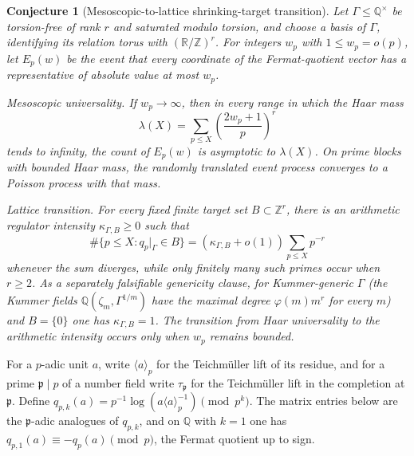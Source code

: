 \documentclass[11pt]{article}
\newtheorem{conjecture}{Conjecture}
\theoremstyle{definition}
\newcommand{\Z}{\mathbb Z}
\newcommand{\Q}{\mathbb Q}
\newcommand{\R}{\mathbb R}
\providecommand{\Z}{\mathbb Z}
\providecommand{\Q}{\mathbb Q}
\providecommand{\R}{\mathbb R}
\begin{document}
\begin{conjecture}[Mesoscopic-to-lattice shrinking-target transition]\label{s13}
Let $\Gamma\le\Q^\times$ be torsion-free of rank $r$ and saturated modulo torsion, and choose a
basis of $\Gamma$, identifying its relation torus with $(\R/\Z)^r$.  For integers $w_p$ with $1\le w_p=o(p)$, let $E_p(w)$ be the event
that every coordinate of the Fermat-quotient vector has a representative of absolute
value at most $w_p$.

\emph{Mesoscopic universality.}  If $w_p\to\infty$, then in every range in which the
Haar mass
\[
 \lambda(X)=\sum_{p\le X}\left(\frac{2w_p+1}{p}\right)^r
\]
tends to infinity, the count of $E_p(w)$ is asymptotic to $\lambda(X)$.  On prime
blocks with bounded Haar mass, the randomly translated event process converges to
a Poisson process with that mass.

\emph{Lattice transition.}  For every fixed finite target set
$B\subset\Z^r$, there is an arithmetic regulator intensity
$\kappa_{\Gamma,B}\ge0$ such that
\[
 \#\{p\le X:q_p|_\Gamma\in B\}
 =(\kappa_{\Gamma,B}+o(1))\sum_{p\le X}p^{-r}
\]
whenever the sum diverges, while only finitely many such primes occur when $r\ge2$.
As a separately falsifiable genericity clause, for Kummer-generic $\Gamma$ (the Kummer fields $\Q(\zeta_m,\Gamma^{1/m})$ have the maximal degree $\varphi(m)m^{r}$ for every $m$) and $B=\{0\}$ one has $\kappa_{\Gamma,B}=1$.  The transition from
Haar universality to the arithmetic intensity occurs only when $w_p$ remains bounded.
\end{conjecture}

For a $p$-adic unit $a$, write $\langle a\rangle_p$ for the Teichm\"uller lift of
its residue, and for a prime $\mathfrak p\mid p$ of a number field write
$\tau_{\mathfrak p}$ for the Teichm\"uller lift in the completion at
$\mathfrak p$.  Define
$ q_{p,k}(a)=p^{-1}\log(a\langle a\rangle_p^{-1})\pmod{p^k}$.  The matrix entries below are the $\mathfrak p$-adic analogues of $q_{p,k}$, and on $\Q$ with $k=1$ one has $q_{p,1}(a)\equiv-q_p(a)\pmod p$, the Fermat quotient up to sign.
\end{document}
